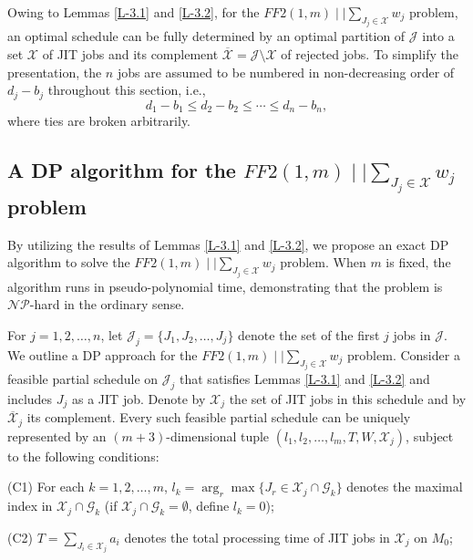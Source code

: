 \documentclass[12pt, eqno, limlimits]{article}
\begin{document}
\begin{sloppypar}
        Owing to Lemmas \ref{L-3.1} and \ref{L-3.2}, for the $FF2(1, m) \mid \mid \sum_{J_j \in \mathcal{X}} w_j$ problem, an optimal schedule can be fully determined by an optimal partition of $\mathcal{J}$ into a set $\mathcal{X}$ of JIT jobs and its complement $\overline{\mathcal{X}}=\mathcal{J} \setminus \mathcal{X}$ of rejected jobs. To simplify the presentation, the $n$ jobs are assumed to be numbered in non-decreasing order of $d_j-b_j$ throughout this section, i.e.,
        \begin{equation}\label{E-3.0}
            d_1-b_1 \leq d_2-b_2 \leq \cdots \leq d_n-b_n,
        \end{equation}
        where ties are broken arbitrarily.
        
        \subsection{A DP algorithm for the $FF2(1, m)\mid \mid \sum_{J_j \in \mathcal{X}} w_j$ problem}
        
        By utilizing the results of Lemmas \ref{L-3.1} and \ref{L-3.2}, we  propose an exact DP algorithm to solve the $FF2(1, m) \mid \mid \sum_{J_j \in \mathcal{X}} w_j$ problem. When $m$ is fixed, the algorithm runs in pseudo-polynomial time, demonstrating that the problem is $\mathcal{NP}$-hard in the ordinary sense.    
        
        For $j=1, 2, \ldots, n$, let $\mathcal{J}_j=\{J_1, J_2, \ldots, J_j\}$ denote the set of the first $j$ jobs in  $\mathcal{J}$. We outline a DP approach for the $FF2(1, m)\mid \mid \sum_{J_j \in \mathcal{X}} w_j$ problem. Consider a feasible partial schedule on $\mathcal{J}_j$ that satisfies Lemmas \ref{L-3.1} and \ref{L-3.2} and includes $J_j$ as a JIT job. Denote by $\mathcal{X}_j$ the set of JIT jobs in this schedule and by $\overline{\mathcal{X}}_j$ its complement. Every such feasible partial schedule can be uniquely represented by an $(m+3)$-dimensional tuple $(l_1, l_2, \ldots, l_m, T, W, \mathcal{X}_j)$, subject to the following conditions:
        \begin{description}
            \item (C1) For each $k=1, 2, \ldots, m$, $l_k=\arg_r \max\{J_r \in \mathcal{X}_j \cap \mathcal{G}_k\}$ denotes the maximal index in $\mathcal{X}_j \cap \mathcal{G}_k$ (if $\mathcal{X}_j \cap \mathcal{G}_k=\emptyset$, define $l_k=0$);
            
            \item (C2) $T=\sum_{J_i \in \mathcal{X}_j} a_i$ denotes the total processing time of JIT jobs in $\mathcal{X}_j$ on $M_0$;
            

\end{description}
\end{sloppypar}
\end{document}
